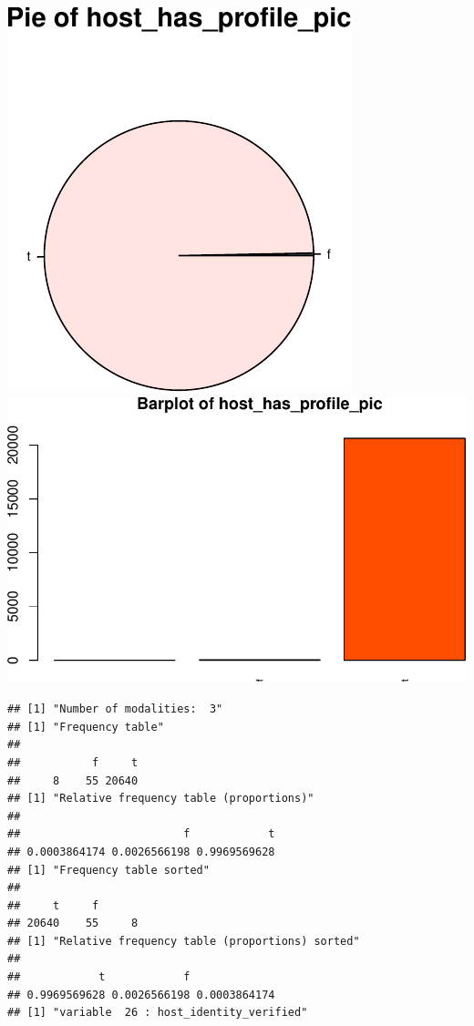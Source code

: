 \includegraphics{anal_files/figure-latex/unnamed-chunk-7-12.pdf}
\includegraphics{anal_files/figure-latex/unnamed-chunk-7-13.pdf}

\begin{verbatim}
## [1] "Number of modalities:  3"
## [1] "Frequency table"
## 
##           f     t 
##     8    55 20640 
## [1] "Relative frequency table (proportions)"
## 
##                         f            t 
## 0.0003864174 0.0026566198 0.9969569628 
## [1] "Frequency table sorted"
## 
##     t     f       
## 20640    55     8 
## [1] "Relative frequency table (proportions) sorted"
## 
##            t            f              
## 0.9969569628 0.0026566198 0.0003864174 
## [1] "variable  26 : host_identity_verified"
\end{verbatim}

